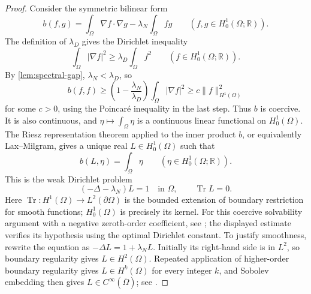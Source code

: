 \begin{proof}
Consider the symmetric bilinear form
\[
 b(f,g)=\int_\Omega\nabla f\cdot\nabla g
        -\lambda_N\int_\Omega fg
 \qquad(f,g\in H_0^1(\Omega;\mathbb R)).
\]
The definition of $\lambda_D$ gives the Dirichlet inequality
\begin{equation}\label{eq:dirichlet-inequality}
 \int_\Omega|\nabla f|^2\ge\lambda_D\int_\Omega f^2
 \qquad(f\in H_0^1(\Omega;\mathbb R)).
\end{equation}
By \cref{lem:spectral-gap}, $\lambda_N<\lambda_D$, so
\[
 b(f,f)\ge
 \left(1-\frac{\lambda_N}{\lambda_D}\right)
 \int_\Omega|\nabla f|^2
 \ge c\|f\|_{H^1(\Omega)}^2
\]
for some $c>0$, using the Poincar\'e inequality in the last step.
Thus $b$ is coercive. It is also continuous, and
$\eta\mapsto\int_\Omega\eta$ is a continuous linear functional on
$H_0^1(\Omega)$. The Riesz representation theorem applied to the inner
product $b$, or equivalently Lax--Milgram, gives a unique real
$L\in H_0^1(\Omega)$ such that
\begin{equation}\label{eq:L-weak}
 b(L,\eta)=\int_\Omega\eta
 \qquad(\eta\in H_0^1(\Omega;\mathbb R)).
\end{equation}
This is the weak Dirichlet problem
\[
 (-\Delta-\lambda_N)L=1\quad\text{in }\Omega,
 \qquad \operatorname{Tr}L=0.
\]
Here $\operatorname{Tr}:H^1(\Omega)\to L^2(\partial\Omega)$ is the
bounded extension of boundary restriction for smooth functions;
$H_0^1(\Omega)$ is precisely its kernel.
For this coercive solvability argument with a negative zeroth-order
coefficient, see \cite[Example 4.14, p.~100]{Hunter}; the displayed
estimate verifies its hypothesis using the optimal Dirichlet constant.
To justify smoothness, rewrite the equation as
$-\Delta L=1+\lambda_NL$. Initially its right-hand side is in $L^2$,
so boundary regularity gives $L\in H^2(\Omega)$. Repeated application
of higher-order boundary regularity gives $L\in H^k(\Omega)$ for every
integer $k$, and Sobolev embedding then gives
$L\in C^\infty(\overline\Omega)$; see
\cite[Theorem 4.31 and Corollary 4.32, p.~116]{Hunter}.


\end{proof}
